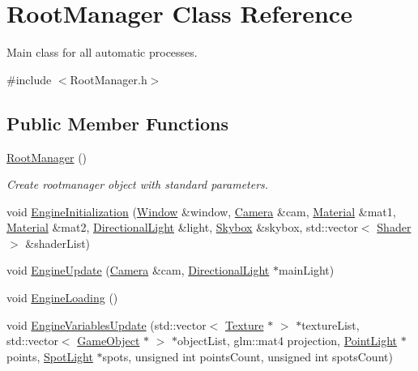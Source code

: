 \hypertarget{class_root_manager}{}\section{Root\+Manager Class Reference}
\label{class_root_manager}


Main class for all automatic processes.  




{\ttfamily \#include $<$Root\+Manager.\+h$>$}

\subsection*{Public Member Functions}
\begin{DoxyCompactItemize}
\item 
\mbox{\label{class_root_manager_a53b21e9c4e78c18d24fd7cdac901a633}} 
\mbox{\hyperlink{class_root_manager_a53b21e9c4e78c18d24fd7cdac901a633}{Root\+Manager}} ()
\begin{DoxyCompactList}\small\item\em Create rootmanager object with standard parameters. \end{DoxyCompactList}\item 
void \mbox{\hyperlink{class_root_manager_aaeadd95892c6fa7eb1e909662ee346e8}{Engine\+Initialization}} (\mbox{\hyperlink{class_window}{Window}} \&window, \mbox{\hyperlink{class_camera}{Camera}} \&cam, \mbox{\hyperlink{class_material}{Material}} \&mat1, \mbox{\hyperlink{class_material}{Material}} \&mat2, \mbox{\hyperlink{class_directional_light}{Directional\+Light}} \&light, \mbox{\hyperlink{class_skybox}{Skybox}} \&skybox, std\+::vector$<$ \mbox{\hyperlink{class_shader}{Shader}} $>$ \&shader\+List)
\item 
void \mbox{\hyperlink{class_root_manager_adbf691a002983aec18a65754a397db73}{Engine\+Update}} (\mbox{\hyperlink{class_camera}{Camera}} \&cam, \mbox{\hyperlink{class_directional_light}{Directional\+Light}} $\ast$main\+Light)
\item 
void \mbox{\hyperlink{class_root_manager_a7a4c2cfb0947b97e2af89b2ed4075990}{Engine\+Loading}} ()
\item 
void \mbox{\hyperlink{class_root_manager_a21effc3c173615d7cf7208914f9d3109}{Engine\+Variables\+Update}} (std\+::vector$<$ \mbox{\hyperlink{class_texture}{Texture}} $\ast$ $>$ $\ast$texture\+List, std\+::vector$<$ \mbox{\hyperlink{class_game_object}{Game\+Object}} $\ast$ $>$ $\ast$object\+List, glm\+::mat4 projection, \mbox{\hyperlink{class_point_light}{Point\+Light}} $\ast$points, \mbox{\hyperlink{class_spot_light}{Spot\+Light}} $\ast$spots, unsigned int points\+Count, unsigned int spots\+Count)

\end{DoxyCompactItemize}
